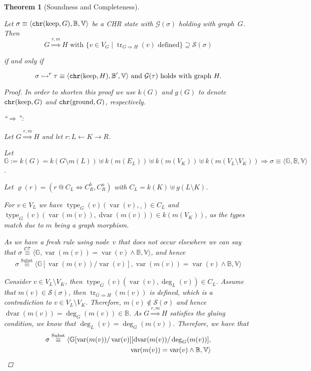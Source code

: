 \documentclass{tlp}
\newtheorem{theorem}{Theorem}\newtheorem{corollary}[theorem]{Corollary}
\newcommand{\st}[3]{\ensuremath{\langle #1 , #2 , #3 \rangle}}
\newcommand{\CT}{\ensuremath{\mathcal{CT}}}
\newcommand{\mcG}{\ensuremath{\mathcal{G}}}
\newcommand{\bbB}{\ensuremath{\mathbb{B}}}
\newcommand{\bbG}{\ensuremath{\mathbb{G}}}
\newcommand{\bbV}{\ensuremath{\mathbb{V}}}
\newcommand{\der}{\ensuremath{\rightarrowtail}}
\newcommand{\dergts}{\ensuremath{\Rightarrow}}
\DeclareMathOperator{\var}{var}
\DeclareMathOperator{\dvar}{dvar}
\DeclareMathOperator{\type}{type}
\DeclareMathOperator{\gnd}{ground}
\DeclareMathOperator{\kp}{keep}
\DeclareMathOperator{\track}{tr}
\newcommand{\chr}{\ensuremath{{\tt chr}}}
\newcommand{\chrrule}{\ensuremath{\varrho}}
\newcommand{\eqct}{\ensuremath{\stackrel{\CT}{\equiv}}}
\newcommand{\eqsubst}{\ensuremath{\stackrel{\text{Subst}}{\equiv}}}
\newcommand{\strong}{\ensuremath{\mathcal{S}}}
\begin{document}
\begin{theorem}[Soundness and Completeness]\label{thm:sound_and_complete}

Let $\sigma \equiv \st{\chr(\kp,G)}{\bbB}{\bbV}$ be a CHR state with
$\mcG(\sigma)$ holding with graph~$G$. Then \[ G \stackrel{r,m}{\Longrightarrow}
H \text{ with }  \{v \in V_G \mid \track_{G \dergts H}(v) \text{ defined}\}
\supseteq \strong(\sigma)\]
\centerline{if and only if}
\[ \sigma \der^r \tau \equiv \st{\chr(\kp,H)}{\bbB'}{\bbV} \text{ and }
\mcG(\tau) \text{ holds with graph } H.\]

\begin{proof}

In order to shorten this proof we use $k(G)$ and $g(G)$ to denote $\chr(\kp,G)$
and $\chr(\gnd,G)$, respectively.

``$\Longrightarrow$'':

Let $G \stackrel{r,m}{\Longrightarrow} H$ and let $r: L \leftarrow K
\rightarrow R$.

Let $\bbG := k(G) = k(G \setminus m(L)) \uplus k(m(E_L)) \uplus k(m(V_K)) \uplus
k(m(V_L \setminus V_K)) \Rightarrow \sigma \equiv \st{\bbG}{\bbB}{\bbV}$.

Let $\chrrule(r) = (r\ @\ C_L \Leftrightarrow C_R^b,C_R^u)$ with $C_L = k(K)
\uplus g(L\setminus K)$.

For $v \in V_L$ we have $\type_G(v)(\var(v),\_) \in C_L$ and\\
$\type_G(v)(\var(m(v)), \dvar(m(v))) \in k(m(V_K))$, as the types match due to
$m$ being a graph morphism.

As we have a fresh rule using node~$v$ that does not occur elsewhere we can say
that $\sigma \eqct \st{\bbG}{\var(m(v)) = \var(v) \land \bbB}{\bbV}$, and hence
\begin{eqnarray}
\label{eq:sigma_subst}
\sigma \eqsubst
\st{\bbG[\var(m(v))/\var(v)]}{\var(m(v)) = \var(v) \land \bbB}{\bbV}
\end{eqnarray}

Consider $v \in V_L \setminus V_K$, then $\type_G(v)(\var(v),\deg_L(v)) \in
C_L$. Assume that $m(v) \in \strong(\sigma)$, then $\track_{G \dergts H}(m(v))$
is defined, which is a contradiction to $v \in V_L \setminus V_K$. Therefore, $m(v)
\not \in \strong(\sigma)$ and hence $\dvar(m(v)) = \deg_G(m(v)) \in \bbB$. As
$G \stackrel{r,m}{\Longrightarrow} H$ satisfies the gluing condition, we know 
that $\deg_L(v) = \deg_G(m(v))$. Therefore, we have that
\begin{eqnarray*}
\sigma\eqsubst
\st{\bbG[\var(m(v))/\var(v)][\dvar(m(v))/\deg_G(m(v))]}{\\\var(m(v))=\var(v)
\land \bbB}{\bbV}
\end{eqnarray*}


\end{proof}
\end{theorem}
\end{document}
